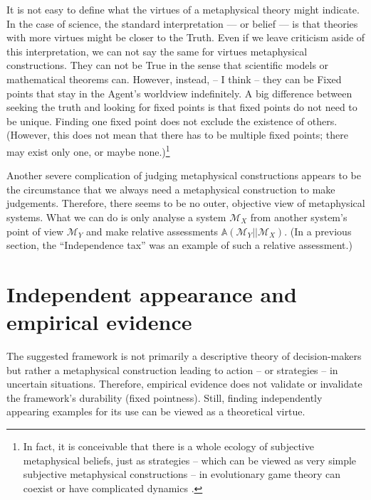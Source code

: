 \documentclass{article}
\begin{document}
It is not easy to define what the virtues of a metaphysical theory might indicate. In the case of science, the standard interpretation — or belief — is that theories with more virtues might be closer to the Truth. Even if we leave criticism aside of this interpretation, we can not say the same for virtues metaphysical constructions. They can not be True in the sense that scientific models or mathematical theorems can. However, instead, -- I think -- they can be Fixed points that stay in the Agent's worldview indefinitely.
A big difference between seeking the truth and looking for fixed points is that fixed points do not need to be unique. Finding one fixed point does not exclude the existence of others. (However, this does not mean that there has to be multiple fixed points; there may exist only one, or maybe none.)\footnote{In fact, it is conceivable that there is a whole ecology of subjective metaphysical beliefs, just as strategies -- which can be viewed as very simple subjective metaphysical constructions -- in evolutionary game theory can coexist or have complicated dynamics \cite{paper:ChaosGame}.}

Another severe complication of judging metaphysical constructions appears to be the circumstance that we always need a metaphysical construction to make judgements. Therefore, there seems to be no outer, objective view of metaphysical systems. What we can do is only analyse a system $\mathscr{M}_X$ from another system's point of view $\mathscr{M}_Y$ and make relative assessments $\mathbb{A}(\mathscr{M}_Y || \mathscr{M}_X)$.
(In a previous section, the ``Independence tax'' was an example of such a relative assessment.)



\section*{Independent appearance and empirical evidence}

The suggested framework is not primarily a descriptive theory of decision-makers but rather a metaphysical construction leading to action -- or strategies -- in uncertain situations.
Therefore, empirical evidence does not validate or invalidate the framework's durability (fixed pointness). Still, finding independently appearing examples for its use can be viewed as a theoretical virtue.
\end{document}
